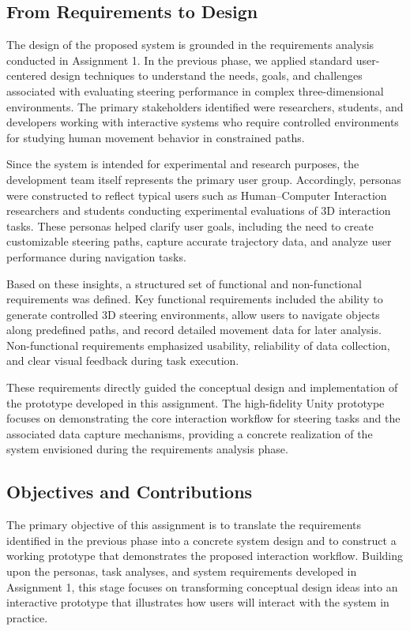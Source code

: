 \documentclass[sigconf]{acmart}
\begin{document}
\subsection{From Requirements to Design}

The design of the proposed system is grounded in the requirements analysis conducted in Assignment 1. In the previous phase, we applied standard user-centered design techniques to understand the needs, goals, and challenges associated with evaluating steering performance in complex three-dimensional environments. The primary stakeholders identified were researchers, students, and developers working with interactive systems who require controlled environments for studying human movement behavior in constrained paths.

Since the system is intended for experimental and research purposes, the development team itself represents the primary user group. Accordingly, personas were constructed to reflect typical users such as Human–Computer Interaction researchers and students conducting experimental evaluations of 3D interaction tasks. These personas helped clarify user goals, including the need to create customizable steering paths, capture accurate trajectory data, and analyze user performance during navigation tasks.

Based on these insights, a structured set of functional and non-functional requirements was defined. Key functional requirements included the ability to generate controlled 3D steering environments, allow users to navigate objects along predefined paths, and record detailed movement data for later analysis. Non-functional requirements emphasized usability, reliability of data collection, and clear visual feedback during task execution.

These requirements directly guided the conceptual design and implementation of the prototype developed in this assignment. The high-fidelity Unity prototype focuses on demonstrating the core interaction workflow for steering tasks and the associated data capture mechanisms, providing a concrete realization of the system envisioned during the requirements analysis phase.

\subsection{Objectives and Contributions}

The primary objective of this assignment is to translate the requirements identified in the previous phase into a concrete system design and to construct a working prototype that demonstrates the proposed interaction workflow. Building upon the personas, task analyses, and system requirements developed in Assignment 1, this stage focuses on transforming conceptual design ideas into an interactive prototype that illustrates how users will interact with the system in practice.
\end{document}
